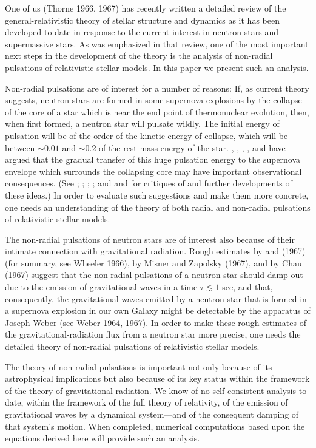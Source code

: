 \documentclass[12pt]{article}
\begin{document}
One of us (Thorne 1966, 1967) has recently written a detailed review of the general-relativistic
theory of stellar structure and dynamics as it has been developed to date in response to the current
interest in neutron stars and supermassive stars. As was emphasized in that review, one of the most
important next steps in the development of the theory is the analysis of non-radial pulsations of
relativistic stellar models. In this paper we present such an analysis.

Non-radial pulsations are of interest for a number of reasons: If, as current theory suggests,
neutron stars are formed in some supernova explosions by the collapse of the core of a star which is
near the end point of thermonuclear evolution, then, when first formed, a neutron star will pulsate
wildly. The initial energy of pulsation will be of the order of the kinetic energy of collapse, which
will be between $\sim 0.01$ and $\sim 0.2$ of the rest mass-energy of the star.
\cite{Hoyle1964}, \cite{Narikiar1964}, \cite{Cameron1965a}, \cite{Cameron1965b}, and \cite{Finzi1965}
have argued that the gradual transfer of this huge pulsation energy to the supernova envelope which surrounds the collapsing core may have important observational consequences.
(See \cite{Wheeler1966}; \cite{Meltzer1966}; \cite{Thorne1966}; \cite{Finzi1966}; and
\cite{Tsuruta1966} and \cite{Cameron1966} for critiques of and further developments of these ideas.)
In order to evaluate such suggestions and make them more concrete, one needs an understanding of the
theory of both radial and non-radial pulsations of relativistic stellar models.

The non-radial pulsations of neutron stars are of interest also because of their intimate connection
with gravitational radiation. Rough estimates by \cite{Zee1966} and \cite{Wheeler1966}
(1967) (for summary, see Wheeler 1966), by Misner and Zapolsky (1967), and by Chau
(1967) suggest that the non-radial pulsations of a neutron star should damp out due
to the emission of gravitational waves in a time $\tau \lesssim 1$ sec, and that, consequently, the
gravitational waves emitted by a neutron star that is formed in a supernova explosion in
our own Galaxy might be detectable by the apparatus of Joseph Weber (see Weber
1964, 1967). In order to make these rough estimates of the gravitational-radiation flux
from a neutron star more precise, one needs the detailed theory of non-radial pulsations
of relativistic stellar models.

The theory of non-radial pulsations is important not only because of its astrophysical
implications but also because of its key status within the framework of the theory of
gravitational radiation. We know of no self-consistent analysis to date, within the
framework of the full theory of relativity, of the emission of gravitational waves by a
dynamical system---and of the consequent damping of that system's motion. When completed,
numerical computations based upon the equations derived here will provide
such an analysis.
\end{document}
